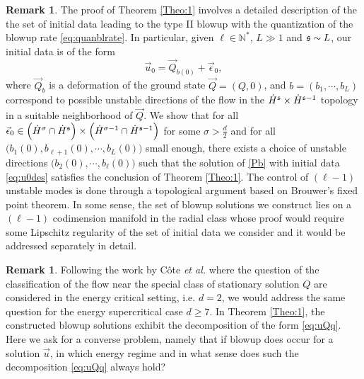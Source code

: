 \documentclass[11pt]{aims}
\theoremstyle{definition}
\newtheorem{remark}[theorem]{Remark}
\numberwithin{equation}{section}
\begin{document}
\begin{remark} The proof of Theorem \ref{Theo:1} involves a detailed description of the the set of initial data leading to the type II blowup with the quantization of the blowup rate \eqref{eq:quanblrate}. In particular, given $\ell \in \mathbb{N}^*$, $L \gg 1$ and $\frak{s} \sim L$,  our initial data is of the form 
\begin{equation}\label{eq:u0des}
\vec u_0 = \vec Q_{b(0)} + \vec \epsilon_0,
\end{equation}
where $\vec Q_{b}$ is a deformation of the ground state $\vec Q = (Q,0)$, and $b = (b_1, \cdots, b_L)$ correspond to possible unstable directions of the flow in the $\dot{H}^\frak{s}\times \dot{H}^{\frak{s} - 1}$ topology in a suitable neighborhood of $\vec Q$. We show that for all $\vec \epsilon_0 \in \Big(\dot{H}^\sigma \cap \dot{H}^\frak{s}\Big) \times \Big(\dot{H}^{\sigma - 1} \cap \dot{H}^{\frak{s} - 1}\Big)$ for some $\sigma > \frac{d}{2}$ and for all $\big(b_1(0), b_{\ell + 1}(0), \cdots, b_L(0)\big)$ small enough, there exists a choice of unstable directions $\big(b_2(0), \cdots, b_\ell(0)\big)$ such that the solution of \eqref{Pb} with initial data \eqref{eq:u0des} satisfies the conclusion of Theorem \ref{Theo:1}. The control of $(\ell - 1)$ unstable modes is done through a topological argument based on Brouwer's fixed point theorem. In some sense, the set of blowup solutions we construct lies on a $(\ell - 1)$ codimension manifold in the radial class whose proof would require some Lipschitz regularity of the set of initial data we consider and it would be addressed separately in detail.
\end{remark}

\begin{remark} Following the work by C\^ote \textit{et al.} \cite{CKLSajm15I, CKLSajm15II} where the question of the classification of the flow near the special class of stationary solution $Q$ are considered in the energy critical setting, i.e. $d  = 2$, we would address the same question for the energy supercritical case $d \geq 7$. In Theorem \ref{Theo:1}, the constructed blowup solutions exhibit the decomposition of the form \eqref{eq:uQq}. Here we ask for a converse problem, namely that if blowup does occur for a solution $\vec u$, in which energy regime and in what sense does such the decomposition \eqref{eq:uQq} always hold?
\end{remark}

\bigskip
\end{document}

